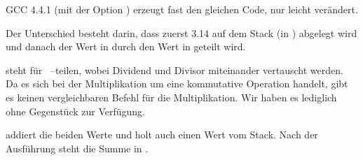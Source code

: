 
GCC 4.4.1 (mit der Option \Othree) erzeugt fast den gleichen Code, nur leicht
verändert.

 Der Unterschied
besteht darin, dass zuerst 3.14 auf dem Stack (in ) abgelegt wird und danach der Wert in  durch den Wert in 
geteilt wird.

\FDIVR steht für ~--teilen, wobei Dividend und Divisor
miteinander vertauscht werden. Da es sich bei der Multiplikation um eine
kommutative Operation handelt, gibt es keinen vergleichbaren Befehl für die
Multiplikation. Wir haben es lediglich \FMUL ohne  Gegenstück zur
Verfügung.

\FADDP addiert die beiden Werte und holt auch einen Wert vom Stack. 
Nach der Ausführung steht die Summe in .

